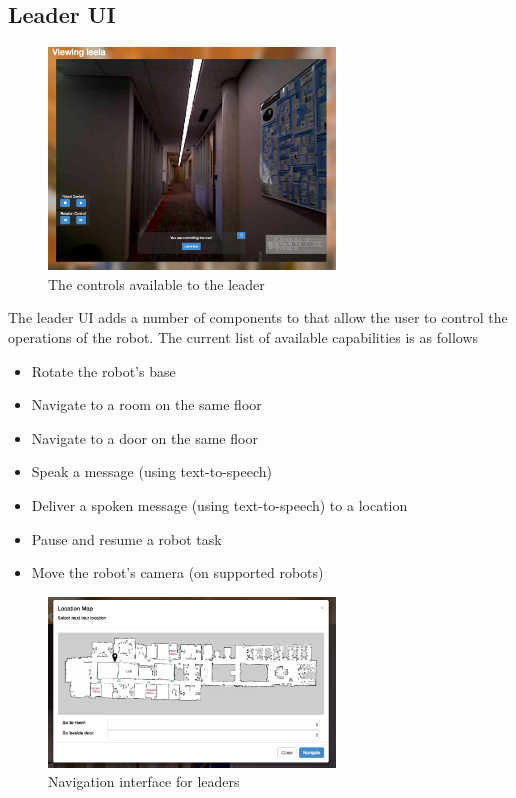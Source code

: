\documentclass[
  oneside,
  11pt, a4paper,
  footinclude=true,
  headinclude=true,
  cleardoublepage=empty
]{article}
\begin{document}
\subsection{Leader UI}

\begin{figure}
\centering
\includegraphics[width=3in]{leader_ui}
\caption{The controls available to the leader}
\end{figure}



The leader UI adds a number of components to that allow the user to
control the operations of the robot. The current list of available capabilities
is as follows

\begin{itemize}
  \item Rotate the robot's base
  \item Navigate to a room on the same floor
  \item Navigate to a door on the same floor
  \item Speak a message (using text-to-speech)
  \item Deliver a spoken message (using text-to-speech) to a location
  \item Pause and resume a robot task
  \item Move the robot's camera (on supported robots)
\end{itemize}

\begin{figure}
\centering
\includegraphics[width=3in]{nav_ui}
\caption{Navigation interface for leaders}
\end{figure}
\end{document}
